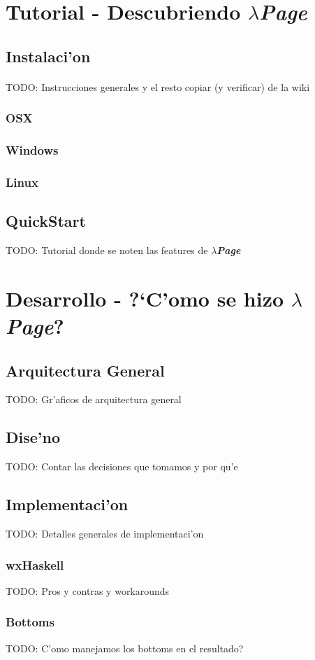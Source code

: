 \documentclass[a4paper]{article}
\newcommand{\hpage}{\textbf{\textsl{$\lambda$Page}}}
\begin{document}
\section{Tutorial - Descubriendo \hpage}
\subsection{Instalaci'on}
\paragraph{}TODO: Instrucciones generales y el resto copiar (y verificar) de la wiki
\subsubsection{OSX}
\subsubsection{Windows}
\subsubsection{Linux}
\subsection{QuickStart}TODO: Tutorial donde se noten las features de \hpage
\newpage

\section{Desarrollo - ?`C'omo se hizo \hpage?}
\subsection{Arquitectura General} TODO: Gr'aficos de arquitectura general
\subsection{Dise'no} TODO: Contar las decisiones que tomamos y por qu'e
\subsection{Implementaci'on} TODO: Detalles generales de implementaci'on
\subsubsection{wxHaskell}TODO: Pros y contras y workarounds
\subsubsection{Bottoms}TODO: C'omo manejamos los bottoms en el resultado?
\end{document}
